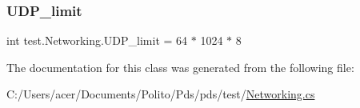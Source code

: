 \mbox{\label{classtest_1_1_networking_a8b2a1dc1555555144e879a44dcfef91c}} 
\subsubsection{\texorpdfstring{U\+D\+P\+\_\+limit}{UDP\_limit}}
{\footnotesize\ttfamily int test.\+Networking.\+U\+D\+P\+\_\+limit = 64 $\ast$ 1024 $\ast$ 8\hspace{0.3cm}{\ttfamily [static]}}



The documentation for this class was generated from the following file\+:\begin{DoxyCompactItemize}
\item 
C\+:/\+Users/acer/\+Documents/\+Polito/\+Pds/pds/test/\hyperlink{_networking_8cs}{Networking.\+cs}\end{DoxyCompactItemize}

